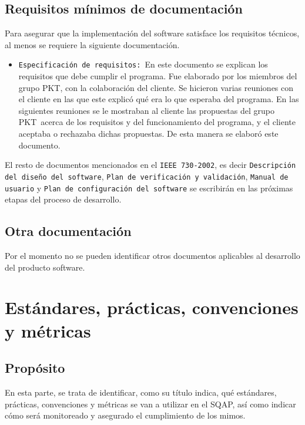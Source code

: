 \documentclass[spanish,a4paper,11pt, twoside]{report}	%
\newcommand*{\PKT}{\hbox{P}\kern-2.5pt\lower3.5pt\hbox{\small{K}}\kern-2.8pt\hbox{T}\kern-2pt}	%
\begin{document}
	\section{Requisitos mínimos de documentación}
		Para asegurar que la implementación del software satisface los requisitos técnicos, al menos se requiere la siguiente documentación.
		\begin{itemize}
		  \item \texttt{Especificación de requisitos: }En este documento se explican los requisitos que debe cumplir el programa. 
		  			Fue elaborado por los miembros del grupo \PKT , con la colaboración del cliente. Se hicieron varias reuniones con el cliente 
		  			en las que este explicó qué era lo que esperaba del programa. En las siguientes reuniones se le mostraban al cliente las propuestas del 
		  			grupo \PKT\ acerca de los requisitos y del funcionamiento del programa, y el cliente aceptaba o rechazaba dichas propuestas. 
		  			De esta manera se elaboró este documento.
		\end{itemize}
		El resto de documentos mencionados en el \texttt{IEEE 730-2002}, es decir \texttt{Descripción del diseño del software}, \texttt{Plan de verificación y validación}, 
		\texttt{Manual de usuario} y  \texttt{Plan de configuración del software} se escribirán en las próximas etapas del proceso de desarrollo. 
	\section{Otra documentación}
		Por el momento no se pueden identificar otros documentos aplicables al desarrollo del producto software.\\
	


\chapter{ Estándares, prácticas, convenciones y métricas}

	\section{Propósito}
	En esta parte, se trata de identificar, como su título indica, qué estándares, prácticas, convenciones y métricas se van a utilizar en el SQAP, así como indicar cómo será monitoreado y asegurado el cumplimiento de los mimos.
	
\end{document}
